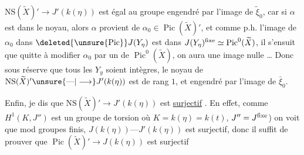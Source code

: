 $\mathrm{NS}(\widetilde X)'\longrightarrow J'(k(\eta))$ est égal au groupe engendré
par l’image de $\tilde\xi_0$, car si $\alpha$ est
dans le noyau, alors $\alpha$ provient de
$\alpha_0\in\operatorname{Pic}(\widetilde X)'$, et comme p.h. l’image de
$\alpha_0$ dans $\deleted{\unsure{\operatorname{Pic}}}J(Y_\eta)$ est dans $J(Y_\eta)^{\rm fixe}\simeq\operatorname{Pic}^0(\widetilde X)$,
il s’ensuit que quitte à modifier $\alpha_0$ par
un  de $\operatorname{Pic}^0(\widetilde X)$, on aura une
image nulle \ldots{} Donc sous réserve
que tous les $Y_y$ soient intègres, le
noyau de $\mathrm{NS}(\widetilde X)'\unsure{\text{---}|\longrightarrow}J'(k(\eta))$ est
de rang $1$, et engendré par l’image de $\bar\xi_0$.

Enfin, je dis que  $\mathrm{NS}(\widetilde X)'\longrightarrow J'(k(\eta))$
est \uline{surjectif} . En effet,  comme $H^1(K,J'')$ est un
groupe de torsion \unsure{[|$T$} où $K=k(\eta)=k(t)$,
$J''=J^{\rm fixe}$) on voit que mod groupes finis,
 $J(k(\eta))\text{---}J'(k(\eta))$ est
surjectif, donc il suffit de prouver
que $\operatorname{Pic}(\widetilde X)'\longrightarrow J(k(\eta))$ est surjectif 
